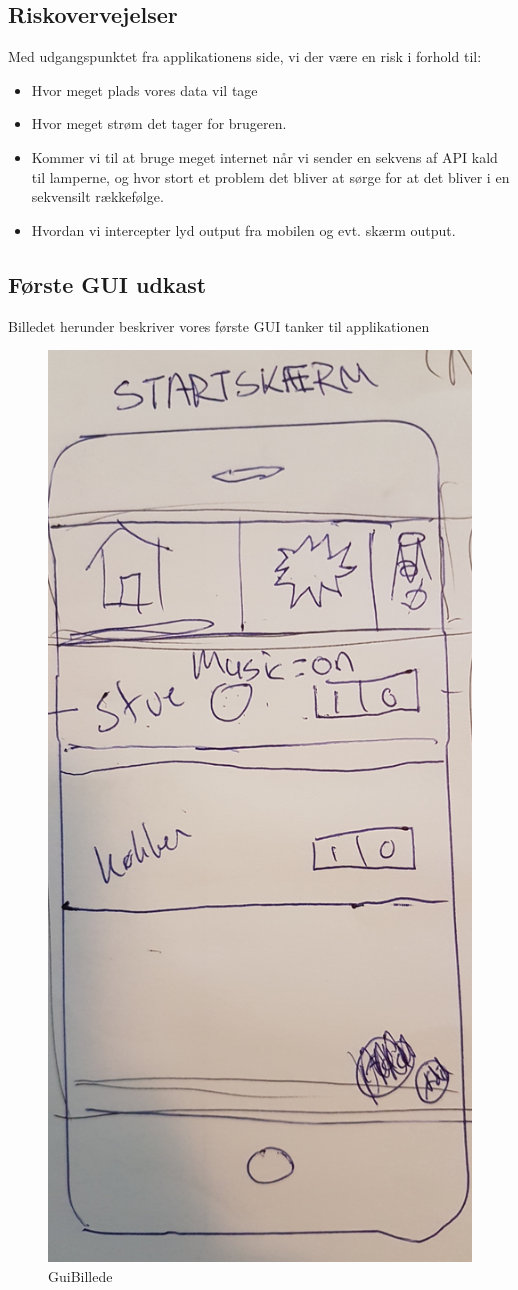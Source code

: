 		\subsection{Riskovervejelser}
		Med udgangspunktet fra applikationens side, vi der være en risk i forhold til:
		\begin{itemize}
			\item Hvor meget plads vores data vil tage
			\item Hvor meget strøm det tager for brugeren. 
			\item Kommer vi til at bruge meget internet når vi sender en sekvens af API kald til lamperne, og hvor stort et problem det bliver at sørge for at det bliver i en sekvensilt rækkefølge.
			\item Hvordan vi intercepter lyd output fra mobilen og evt. skærm output. \newline
		\end{itemize}	
	
		\subsection{Første GUI udkast}
		Billedet herunder beskriver vores første GUI tanker til applikationen
		\begin{figure}[H]
			\centering
			\includegraphics[width=0.6\linewidth, height=1\linewidth]{Kravspecifikation/GUI}
			\caption{GuiBillede}
			\label{fig:GUI udkast}
		\end{figure}
		\newpage
		
